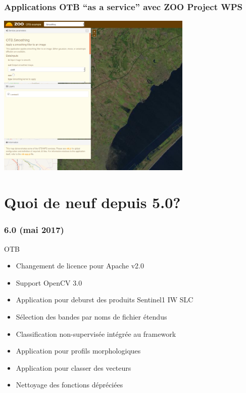 \documentclass[8pt]{beamer}
\begin{document}
\begin{frame}
  \frametitle{Applications OTB ``as a service'' avec ZOO Project WPS}
\begin{minipage}[t][6cm][t]{\textwidth}
\begin{center}
\includegraphics[width=0.7\textwidth]{images/otb_in_zoo.png}
\end{center}
\end{minipage}
\end{frame}

\section{Quoi de neuf depuis 5.0?}



\begin{frame}
  \frametitle{6.0 (mai 2017)}
  \begin{block}{OTB}
    \begin{itemize}
      \item Changement de licence pour Apache v2.0
      \item Support OpenCV 3.0
      \item Application pour deburst des produits Sentinel1 IW SLC
      \item Sélection des bandes par noms de fichier étendus
      \item Classification non-supervisée intégrée au framework
      \item Application pour profils morphologiques
      \item Application pour classer des vecteurs
      \item Nettoyage des fonctions dépréciées
    \end{itemize}
    \end{block}
\end{frame}
\end{document}
